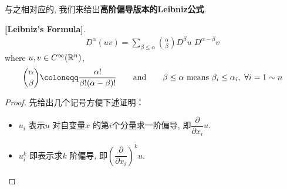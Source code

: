 	与之相对应的, 我们来给出\textbf{高阶偏导版本的Leibniz公式}.
	\begin{thm}\label{thm 1.3.1}
		\textbf{[Leibniz's Formula]}. 
		\begin{align}
			D^{\alpha}(uv) = \sum_{\beta \leq \alpha} {\alpha \choose \beta} D^{\beta}u \,\, D^{\alpha - \beta}v
		\end{align}
		where $u , v \in C^{\infty}(\mathbb{R}^n)$, 
		\[ {\alpha \choose \beta} \coloneqq \dfrac{\alpha !}{\beta ! (\alpha - \beta) !} 
		\hspace*{2em} \text{and} \hspace*{2em} 
		\beta \leq \alpha \,\, \text{means} \,\, \beta_i \leq \alpha_i , \,\, \forall i = 1 \sim n\]
		
		\vspace{6em}
		
		\begin{proof}
			先给出几个记号方便下述证明：
			\begin{itemize}
				\item $u_i$ 表示$u$ 对自变量$x$ 的第$i$个分量求一阶偏导, 即$\dfrac{\partial}{\partial x_i} u$.
				
				\item $u_{i}^k$ 即表示求$k$ 阶偏导, 即$\left( \dfrac{\partial}{\partial x_i} \right)^k u$.
				

\end{itemize}
\end{proof}
\end{thm}
